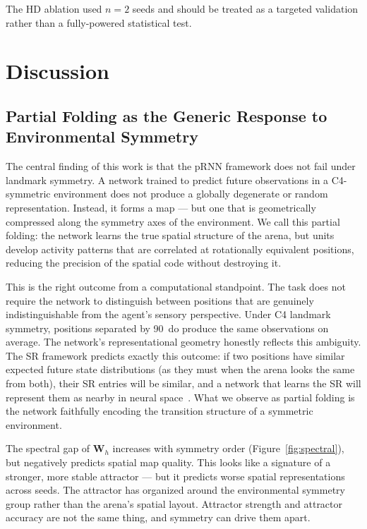\documentclass[11pt, a4paper]{article}
\begin{document}
The HD ablation used $n=2$ seeds and should be treated as a targeted validation rather than a fully-powered statistical test.



\section{Discussion}
\label{sec:discussion}

\subsection{Partial Folding as the Generic Response to Environmental Symmetry}

The central finding of this work is that the pRNN framework does not fail
under landmark symmetry. A network trained to
predict future observations in a C4-symmetric environment does not produce
a globally degenerate or random representation. Instead, it forms a map
--- but one that is geometrically compressed along the symmetry axes of
the environment. We call this partial folding: the network learns the true
spatial structure of the arena, but units develop activity patterns that
are correlated at rotationally equivalent positions, reducing the
precision of the spatial code without destroying it.

This is the right outcome from a computational standpoint. The task does
not require the network to distinguish between positions that are
genuinely indistinguishable from the agent's sensory perspective. Under
C4 landmark symmetry, positions separated by 90\degree~do produce the
same observations on average. The network's representational geometry
honestly reflects this ambiguity. The SR framework predicts exactly this
outcome: if two positions have similar expected future state distributions
(as they must when the arena looks the same from both), their SR entries
will be similar, and a network that learns the SR will represent them as
nearby in neural space~\citep{stachenfeld2017}. What we observe as partial
folding is the network faithfully encoding the transition structure of a
symmetric environment.

The spectral gap of $\mathbf{W}_h$ increases with symmetry order
(Figure~\ref{fig:spectral}), but negatively predicts spatial map quality.
This looks like a signature of a stronger, more stable attractor ---
but it predicts worse spatial representations across seeds. The attractor
has organized around the environmental symmetry group rather than the
arena's spatial layout. Attractor strength and attractor accuracy are not
the same thing, and symmetry can drive them apart.
\end{document}
